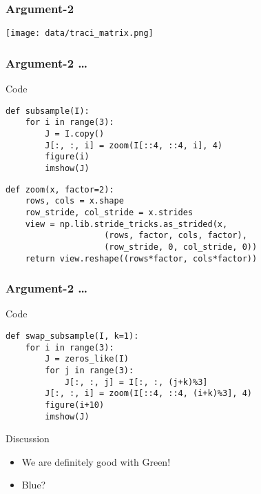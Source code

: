 \documentclass[presentation]{beamer}
\begin{document}
\begin{frame}
\frametitle{Argument-2}
\label{sec-2_7}

      \begin{center}
        \texttt{[image: data/traci\_matrix.png]}
      \end{center}
\end{frame}
\begin{frame}[fragile]
\frametitle{Argument-2 \ldots{}}
\label{sec-2_8}
\begin{block}{Code}
\label{sec-2_8_1}

\lstset{language=Python}
\begin{lstlisting}
def subsample(I):
    for i in range(3):
        J = I.copy()
        J[:, :, i] = zoom(I[::4, ::4, i], 4)
        figure(i)
        imshow(J)
\end{lstlisting}
\lstset{language=Python}
\begin{lstlisting}
def zoom(x, factor=2):
    rows, cols = x.shape
    row_stride, col_stride = x.strides
    view = np.lib.stride_tricks.as_strided(x,
                    (rows, factor, cols, factor),
                    (row_stride, 0, col_stride, 0))
    return view.reshape((rows*factor, cols*factor))
\end{lstlisting}
\end{block}
\end{frame}
\begin{frame}[fragile]
\frametitle{Argument-2 \ldots{}}
\label{sec-2_9}
\begin{block}{Code}
\label{sec-2_9_1}

\lstset{language=Python}
\begin{lstlisting}
def swap_subsample(I, k=1):
    for i in range(3):
        J = zeros_like(I)
        for j in range(3):
            J[:, :, j] = I[:, :, (j+k)%3]
        J[:, :, i] = zoom(I[::4, ::4, (i+k)%3], 4)
        figure(i+10)
        imshow(J)
\end{lstlisting}
      
\end{block}
\begin{block}{Discussion}
\label{sec-2_9_2}
\begin{itemize}

\item We are definitely good with Green!\\
\label{sec-2_9_2_1}%
\item Blue?\\
\label{sec-2_9_2_2}%
\end{itemize} %
\end{block}
\end{frame}
\end{document}
